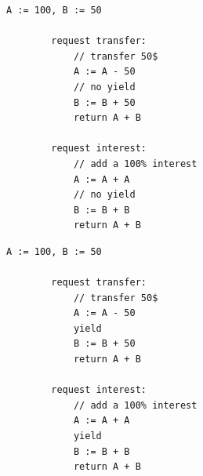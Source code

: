 \noindent
\begin{minipage}[t]{0.45\textwidth}
	\begin{lstlisting}[caption={Serializable},
		label={lst:BankSer}]
	    A := 100, B := 50
	    
	    request transfer: 
	        // transfer 50$
	        A := A - 50
	        // no yield
	        B := B + 50
	        return A + B
				
	    request interest: 
	        // add a 100% interest
	        A := A + A
	        // no yield
	        B := B + B
	        return A + B      
			\end{lstlisting}
\end{minipage}
\hfill
\begin{minipage}[t]{0.45\textwidth}
	\begin{lstlisting}[caption={Not serializable},
		label={lst:BankNonSer}]
	    A := 100, B := 50
			
	    request transfer: 
	        // transfer 50$
	        A := A - 50
	        yield
	        B := B + 50
	        return A + B
	
	    request interest: 
	        // add a 100% interest
	        A := A + A
	        yield
	        B := B + B
	        return A + B
      		\end{lstlisting}
\end{minipage}
	

%




